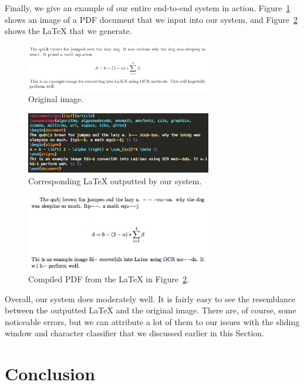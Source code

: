 \documentclass[10pt]{IEEEtran}
\newcommand{\latex}{\LaTeX\xspace}
\begin{document}
Finally, we give an example of our entire end-to-end system in action. Figure~\ref{fig:paper2f} shows an image of a PDF document that we input into our system, and Figure~\ref{fig:latex2f} shows the \latex that we generate.

\begin{figure}[h]
  \centering
    \includegraphics[width=3.2in]{paper2.png}
  \caption{Original image.}
  \label{fig:paper2f}
\end{figure}

\begin{figure}[h]
  \centering
    \includegraphics[width=3.2in]{paper2tex.png}
  \caption{Corresponding \latex outputted by our system.}
  \label{fig:latex2f}
\end{figure}

\begin{figure}[h]
  \centering
    \includegraphics[width=3.2in]{paper2out.png}
  \caption{Compiled PDF from the \latex in Figure~\ref{fig:latex2f}.}
  \label{fig:paper2fout}
\end{figure}

Overall, our system does moderately well. It is fairly easy to see the resemblance between the outputted \latex and the original image. There are, of course, some noticeable errors, but we can attribute a lot of them to our issues with the sliding window and character classifier that we discussed earlier in this Section.

\section{Conclusion}
\end{document}
